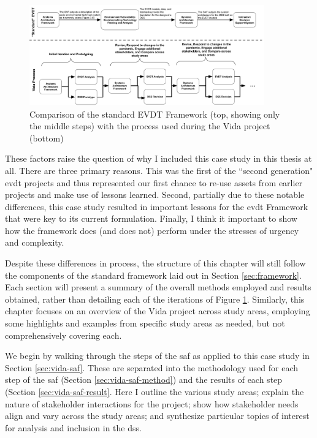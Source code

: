 \begin{figure}[!htb]
	\centering
	\includegraphics[width=0.9\textwidth]{Figures/chap5/saf-comparison.png}
	\caption[Comparison of the standard EVDT Framework with the Vida Process]{Comparison of the standard EVDT Framework (top, showing only the middle steps) with the process used during the Vida project (bottom)}
	\label{fig:saf-comparison}
\end{figure}


These factors raise the question of why I included this case study in this thesis at all. There are three primary reasons. This was the first of the ``second generation" \ac{evdt} projects and thus represented our first chance to re-use assets from earlier projects and make use of lessons learned. Second, partially due to these notable differences, this case study resulted in important lessons for the \ac{evdt} Framework that were key to its current formulation. Finally, I think it important to show how the framework does (and does not) perform under the stresses of urgency and complexity.
	
Despite these differences in process, the structure of this chapter will still follow the components of the standard framework laid out in Section \ref{sec:framework}. Each section will present a summary of the overall methods employed and results obtained, rather than detailing each of the iterations of Figure \ref{fig:saf-comparison}. Similarly, this chapter focuses on an overview of the Vida project across study areas, employing some highlights and examples from specific study areas as needed, but not comprehensively covering each.

We begin by walking through the steps of the \acf{saf} as applied to this case study in Section \ref{sec:vida-saf}. These are separated into the methodology used for each step of the \ac{saf} (Section \ref{sec:vida-saf-method}) and the results of each step (Section \ref{sec:vida-saf-result}. Here I outline the various study areas; explain the nature of stakeholder interactions for the project; show how stakeholder needs align and vary across the study areas; and synthesize particular topics of interest for analysis and inclusion in the \ac{dss}.

